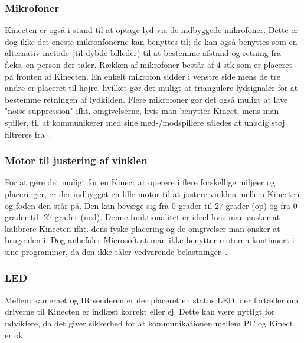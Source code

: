 \subsubsection{Mikrofoner}
Kinecten er også i stand til at optage lyd via de indbyggede mikrofoner.
Dette er dog ikke det eneste mikronfonerne kan benyttes til; de kan også benyttes som en alternativ metode (til dybde billeder) til at bestemme afstand og retning fra f.eks. en person der taler.
Rækken af mikrofoner består af 4 stk som er placeret på fronten af Kinecten.
En enkelt mikrofon sidder i venstre side mens de tre andre er placeret til højre, hvilket gør det muligt at triangulere lydsignaler for at bestemme retningen af lydkilden.
Flere mikrofoner gør det også muligt at lave "noise-suppression" ifht. omgivelserne, hvis man benytter Kinect, mens man spiller, til at kommunikerer med sine med-/modspillere således at unødig støj filtreres fra~\cite[s.~15]{kinectProgrammingGuide}.

\subsubsection{Motor til justering af vinklen}
For at gøre det muligt for en Kinect at operere i flere forskellige miljøer og placeringer, er der indbygget en lille motor til at justere vinklen mellem Kinecten og foden den står på.
Den kan bevæge sig fra 0 grader til 27 grader (op) og fra 0 grader til -27 grader (ned).
Denne funktionalitet er ideel hvis man ønsker at kalibrere Kinecten ifht. dens fyske placering og de omgivelser man ønsker at bruge den i.
Dog anbefaler Microsoft at man ikke benytter motoren kontinuert i sine programmer, da den ikke tåler vedvarende belastninger~\cite{kinectDocElevationAngle}.

\subsubsection{LED}
Mellem kameraet og IR senderen er der placeret en status LED, der fortæller om driverne til Kinecten er indlæst korrekt eller ej.
Dette kan være nyttigt for udviklere, da det giver sikkerhed for at kommunikationen mellem PC og Kinect er ok~\cite[s.~15]{kinectProgrammingGuide}.

